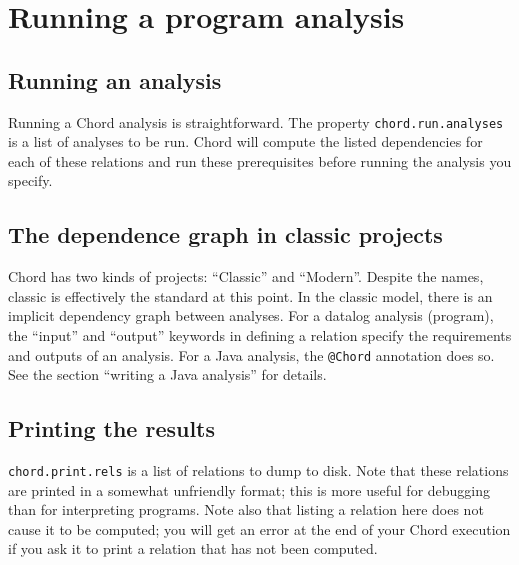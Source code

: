 \section{Running a program analysis}
\label{sec:running-analysis}

\subsection{Running an analysis}
Running a Chord analysis is straightforward.
The property  \texttt{chord.run.analyses} is a list of analyses to be run. Chord will compute the listed dependencies for each of these relations and run these prerequisites before running the analysis you specify.

\subsection{The dependence graph in classic projects}

Chord has two kinds of projects: ``Classic'' and ``Modern''.  Despite the names, classic is effectively the standard at this point.
In the classic model, there is an implicit dependency graph between analyses. For a datalog analysis (program), the ``input'' and ``output'' keywords in defining a relation specify the requirements and outputs of an analysis.  For a Java analysis, the \texttt{@Chord} annotation does so. See the section ``writing a Java analysis'' for details.

\subsection{Printing the results}

\texttt{chord.print.rels} is a list of relations to dump to disk. Note that these relations are printed in a somewhat unfriendly format; this is more useful for debugging than for interpreting programs. Note also that listing a relation here does not cause it to be computed; you will get an error at the end of your Chord execution if you ask it to print a relation that has not been computed.


